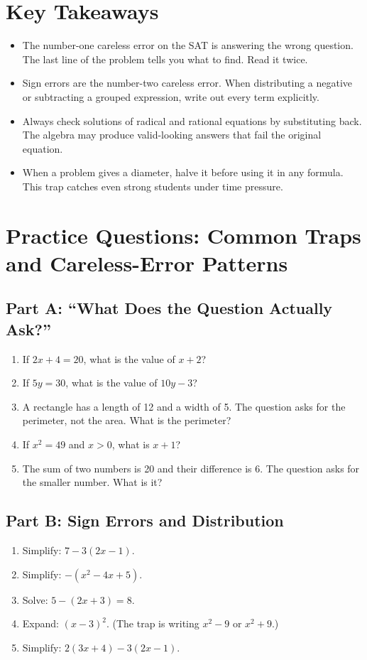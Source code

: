 \documentclass[14pt]{extarticle}
\begin{document}
\section*{Key Takeaways}
\begin{itemize}
  \item The number-one careless error on the SAT is answering the wrong question. The last line of the problem tells you what to find. Read it twice.
  \item Sign errors are the number-two careless error. When distributing a negative or subtracting a grouped expression, write out every term explicitly.
  \item Always check solutions of radical and rational equations by substituting back. The algebra may produce valid-looking answers that fail the original equation.
  \item When a problem gives a diameter, halve it before using it in any formula. This trap catches even strong students under time pressure.
\end{itemize}

\newpage

\section*{Practice Questions: Common Traps and Careless-Error Patterns}

\subsection*{Part A: ``What Does the Question Actually Ask?''}
\begin{enumerate}
  \item If \(2x + 4 = 20\), what is the value of \(x + 2\)?
  \item If \(5y = 30\), what is the value of \(10y - 3\)?
  \item A rectangle has a length of 12 and a width of 5. The question asks for the perimeter, not the area. What is the perimeter?
  \item If \(x^2 = 49\) and \(x > 0\), what is \(x + 1\)?
  \item The sum of two numbers is 20 and their difference is 6. The question asks for the smaller number. What is it?
\end{enumerate}

\subsection*{Part B: Sign Errors and Distribution}
\begin{enumerate}
  \item Simplify: \(7 - 3(2x - 1)\).
  \item Simplify: \(-(x^2 - 4x + 5)\).
  \item Solve: \(5 - (2x + 3) = 8\).
  \item Expand: \((x - 3)^2\). (The trap is writing \(x^2 - 9\) or \(x^2 + 9\).)
  \item Simplify: \(2(3x + 4) - 3(2x - 1)\).
\end{enumerate}
\end{document}
